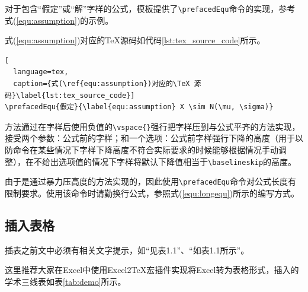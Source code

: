 对于包含“假定”或“解”字样的公式，模板提供了\texttt{\textbackslash prefacedEqu}命令的实现，参考式(\ref{equ:assumption})的示例。


式(\ref{equ:assumption})对应的\TeX 源码如代码\ref{lst:tex_source_code}所示。

\begin{lstlisting}[
  language=tex, 
  caption={式(\ref{equ:assumption})对应的\TeX 源码}\label{lst:tex_source_code}]
\prefacedEqu{假定}{\label{equ:assumption} X \sim N(\mu, \sigma)}
\end{lstlisting}

方法通过在字样后使用负值的\texttt{\textbackslash vspace\{\}}强行把字样压到与公式平齐的方法实现，接受两个参数：公式前的字样；和一个选项：公式前字样强行下降的高度（用于以防命令在某些情况下字样下降高度不符合实际要求的时候能够根据情况手动调整），在不给出选项值的情况下字样将默认下降值相当于\texttt{\textbackslash baselineskip}的高度。

由于是通过暴力压高度的方法实现的，因此使用\texttt{\textbackslash prefacedEqu}命令对公式长度有限制要求。使用该命令时请勤换行公式，参照式(\ref{equ:longequ})所示的编写方式。


\subsection{插入表格}

插表之前文中必须有相关文字提示，如“见表1.1”、“如表1.1所示”。

这里推荐大家在Excel中使用Excel2TeX宏插件实现将Excel转为表格形式，插入的学术三线表如表\ref{tab:demo}所示。

